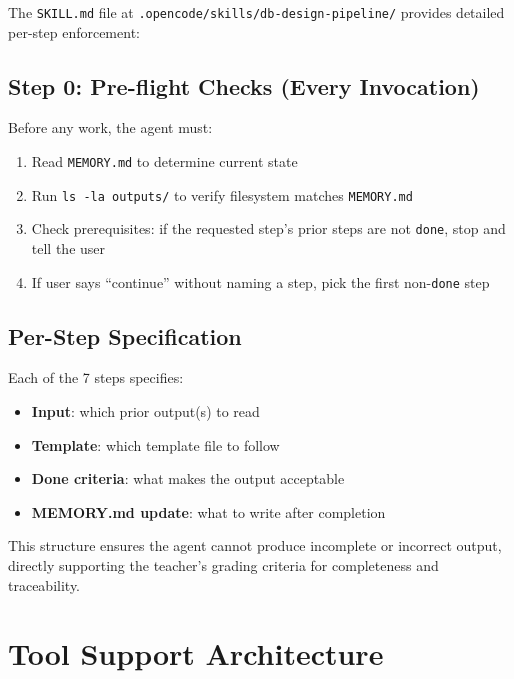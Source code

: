 \documentclass[12pt,a4paper]{article}
\begin{document}
The \texttt{SKILL.md} file at \texttt{.opencode/skills/db-design-pipeline/} provides detailed per-step enforcement:

\subsection{Step 0: Pre-flight Checks (Every Invocation)}

Before any work, the agent must:
\begin{enumerate}
    \item Read \texttt{MEMORY.md} to determine current state
    \item Run \texttt{ls -la outputs/} to verify filesystem matches \texttt{MEMORY.md}
    \item Check prerequisites: if the requested step's prior steps are not \texttt{done}, stop and tell the user
    \item If user says ``continue'' without naming a step, pick the first non-\texttt{done} step
\end{enumerate}

\subsection{Per-Step Specification}

Each of the 7 steps specifies:
\begin{itemize}
    \item \textbf{Input}: which prior output(s) to read
    \item \textbf{Template}: which template file to follow
    \item \textbf{Done criteria}: what makes the output acceptable
    \item \textbf{MEMORY.md update}: what to write after completion
\end{itemize}

This structure ensures the agent cannot produce incomplete or incorrect output, directly supporting the teacher's grading criteria for completeness and traceability.

\section{Tool Support Architecture}
\end{document}

